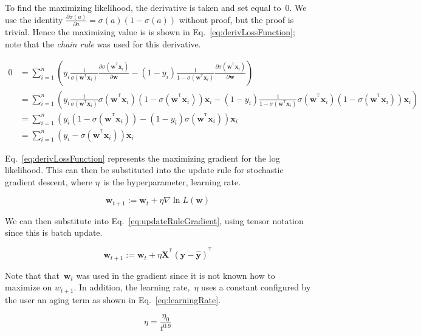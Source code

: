 \documentclass{report}
\newcommand{\xvec}{\mathbf{x}}
\newcommand{\xtensor}{\mathbf{X}}
\newcommand{\y}{\mathbf{y}}
\newcommand{\w}{\mathbf{w}}
\newcommand{\T}{^\textrm{T}}
\newcommand{\wTxi}{\w^{\T}\xvec_{i}}
\newcommand{\yhat}{\hat{\mathbf{y}}}
\begin{document}
  To find the maximizing likelihood, the derivative is taken and set equal to~$0$.  We use the identity ${\frac{\partial \sigma(a)}{\partial a} = \sigma(a)(1-\sigma(a))}$ without proof, but the proof is trivial. Hence the maximizing value is is shown in Eq.~\eqref{eq:derivLossFunction}; note that the \textit{chain rule} was used for this derivative.
  
  \begin{align}
    0 &= \sum_{i=1}^{n} \left( y_i \frac{1}{\sigma(\wTxi)} \frac{\partial \sigma(\wTxi)}{\partial \w} - (1-y_i) \frac{1}{1-\sigma(\wTxi)} \frac{\partial \sigma(\wTxi)}{\partial \w} \right)\\
    &= \sum_{i=1}^{n} \left( y_i \frac{1}{\sigma(\wTxi)} \sigma(\wTxi)(1-\sigma(\wTxi))\xvec_i - (1-y_i) \frac{1}{1-\sigma(\wTxi)} \sigma(\wTxi)(1-\sigma(\wTxi))\xvec_i \right)\\
    &= \sum_{i=1}^{n} \left(y_i (1-\sigma(\wTxi)) - (1-y_i) \sigma(\wTxi) \right)\xvec_i\\
    &= \sum_{i=1}^{n} (y_i -\sigma(\wTxi))\xvec_i \label{eq:derivLossFunction}
  \end{align}
  
  Eq.~\eqref{eq:derivLossFunction} represents the maximizing gradient for the log likelihood.  This can then be substituted into the update rule for stochastic gradient descent, where $\eta$~is the hyperparameter, learning rate.
  
  \begin{equation}
    \w_{t+1}:=\w_{t}+\eta \nabla \ln L(\w)\label{eq:updateRuleGradient}
  \end{equation}
  
  \noindent
  We can then substitute into Eq.~\eqref{eq:updateRuleGradient}, using tensor notation since this is batch update.  
  
 \begin{equation}
  \w_{t+1}:=\w_{t}+\eta \xtensor^{\T}(\y -\yhat)^{\T}\label{eq:finalUpdateRule}
 \end{equation}
  
  \noindent
  Note that that~$\w_{t}$ was used in the gradient since it is not known how to maximize on $w_{t+1}$.  In addition, the learning rate,~$\eta$ uses a constant configured by the user an aging term as shown in Eq.~\eqref{eq:learningRate}.
   
  \begin{equation}
    \eta = \frac{\eta_0}{t^{0.9}}
    \label{eq:learningRate}
  \end{equation}
  
\end{document}
